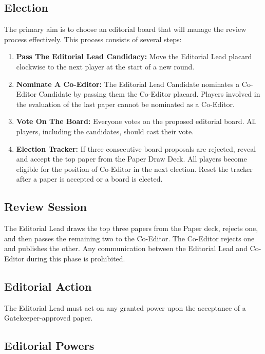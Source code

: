 \documentclass[sigplan,screen,nonacm]{acmart}
\begin{document}
\subsection{Election}

The primary aim is to choose an editorial board that will manage the review process effectively. This process consists of several steps:

\begin{enumerate}
	\item \textbf{Pass The Editorial Lead Candidacy:} Move the Editorial Lead placard clockwise to the next player at the start of a new round.
	\item \textbf{Nominate A Co-Editor:} The Editorial Lead Candidate nominates a Co-Editor Candidate by passing them the Co-Editor placard. Players involved in the evaluation of the last paper cannot be nominated as a Co-Editor.
	\item \textbf{Vote On The Board:} Everyone votes on the proposed editorial board. All players, including the candidates, should cast their vote.
	\item \textbf{Election Tracker:} If three consecutive board proposals are rejected, reveal and accept the top paper from the Paper Draw Deck. All players become eligible for the position of Co-Editor in the next election. Reset the tracker after a paper is accepted or a board is elected.
\end{enumerate}

\subsection{Review Session}

The Editorial Lead draws the top three papers from the Paper deck, rejects one, and then passes the remaining two to the Co-Editor. The Co-Editor rejects one and publishes the other. Any communication between the Editorial Lead and Co-Editor during this phase is prohibited.

\subsection{Editorial Action}

The Editorial Lead must act on any granted power upon the acceptance of a Gatekeeper-approved paper.

\subsection{Editorial Powers}
\end{document}
